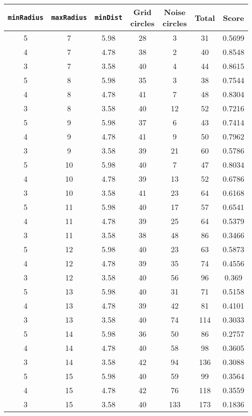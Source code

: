 \documentclass[letterpaper, 12pt]{article}
\begin{document}
\begin{longtable}{|c|c|c|c|c|c|c|}
\hline
\textbf{\texttt{minRadius}} & \textbf{\texttt{maxRadius}} & \textbf{\texttt{minDist}} & \textbf{Grid circles} & \textbf{Noise circles} & \textbf{Total} & \textbf{Score} \\
\hline
5 & 7 & 5.98 & 28 & 3 & 31 & 0.5699 \\
\hline
4 & 7 & 4.78 & 38 & 2 & 40 & 0.8548 \\
\hline
3 & 7 & 3.58 & 40 & 4 & 44 & 0.8615 \\
\hline
5 & 8 & 5.98 & 35 & 3 & 38 & 0.7544 \\
\hline
4 & 8 & 4.78 & 41 & 7 & 48 & 0.8304 \\
\hline
3 & 8 & 3.58 & 40 & 12 & 52 & 0.7216 \\
\hline
5 & 9 & 5.98 & 37 & 6 & 43 & 0.7414 \\
\hline
4 & 9 & 4.78 & 41 & 9 & 50 & 0.7962 \\
\hline
3 & 9 & 3.58 & 39 & 21 & 60 & 0.5786 \\
\hline
5 & 10 & 5.98 & 40 & 7 & 47 & 0.8034 \\
\hline
4 & 10 & 4.78 & 39 & 13 & 52 & 0.6786 \\
\hline
3 & 10 & 3.58 & 41 & 23 & 64 & 0.6168 \\
\hline
5 & 11 & 5.98 & 40 & 17 & 57 & 0.6541 \\
\hline
4 & 11 & 4.78 & 39 & 25 & 64 & 0.5379 \\
\hline
3 & 11 & 3.58 & 38 & 48 & 86 & 0.3466 \\
\hline
5 & 12 & 5.98 & 40 & 23 & 63 & 0.5873 \\
\hline
4 & 12 & 4.78 & 39 & 35 & 74 & 0.4556 \\
\hline
3 & 12 & 3.58 & 40 & 56 & 96 & 0.369 \\
\hline
5 & 13 & 5.98 & 40 & 31 & 71 & 0.5158 \\
\hline
4 & 13 & 4.78 & 39 & 42 & 81 & 0.4101 \\
\hline
3 & 13 & 3.58 & 40 & 74 & 114 & 0.3033 \\
\hline
5 & 14 & 5.98 & 36 & 50 & 86 & 0.2757 \\
\hline
4 & 14 & 4.78 & 40 & 58 & 98 & 0.3605 \\
\hline
3 & 14 & 3.58 & 42 & 94 & 136 & 0.3088 \\
\hline
5 & 15 & 5.98 & 40 & 59 & 99 & 0.3564 \\
\hline
4 & 15 & 4.78 & 42 & 76 & 118 & 0.3559 \\
\hline
3 & 15 & 3.58 & 40 & 133 & 173 & 0.1836 \\

\end{longtable}
\end{document}
